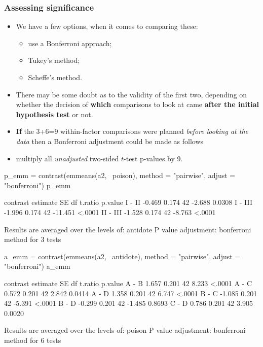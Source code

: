 \documentclass[a4paper]{article}\usepackage[]{graphicx}\usepackage[]{xcolor}
\begin{document}
\subsubsection{Assessing significance}
\begin{itemize}
	\item We have a few options, when it comes to comparing these:
	\begin{itemize}
		\item use a Bonferroni approach;
		\item Tukey's method;
		\item Scheffe's method.
	\end{itemize}
	\item There may be some doubt as to the validity of the first two, depending on whether the decision of \textbf{which} comparisons to look at came \textbf{after the initial hypothesis test} or not.
	\item \textbf{If} the 3+6=9 within-factor comparisons were planned \textit{before looking at the data} then a Bonferroni adjustment could be made as follows
	\item multiply all \textit{unadjusted} two-sided \( t \)-test p-values by 9.
\end{itemize}
\begin{Schunk}
\begin{Sinput}
p_emm = contrast(emmeans(a2, ~poison), method = "pairwise", adjust = "bonferroni")
p_emm
\end{Sinput}
\begin{Soutput}
 contrast estimate    SE df t.ratio p.value
 I - II     -0.469 0.174 42  -2.688  0.0308
 I - III    -1.996 0.174 42 -11.451  <.0001
 II - III   -1.528 0.174 42  -8.763  <.0001

Results are averaged over the levels of: antidote 
P value adjustment: bonferroni method for 3 tests 
\end{Soutput}
\begin{Sinput}
a_emm = contrast(emmeans(a2, ~antidote), method = "pairwise", adjust = "bonferroni")
a_emm
\end{Sinput}
\begin{Soutput}
 contrast estimate    SE df t.ratio p.value
 A - B       1.657 0.201 42   8.233  <.0001
 A - C       0.572 0.201 42   2.842  0.0414
 A - D       1.358 0.201 42   6.747  <.0001
 B - C      -1.085 0.201 42  -5.391  <.0001
 B - D      -0.299 0.201 42  -1.485  0.8693
 C - D       0.786 0.201 42   3.905  0.0020

Results are averaged over the levels of: poison 
P value adjustment: bonferroni method for 6 tests 
\end{Soutput}
\end{Schunk}
\end{document}
